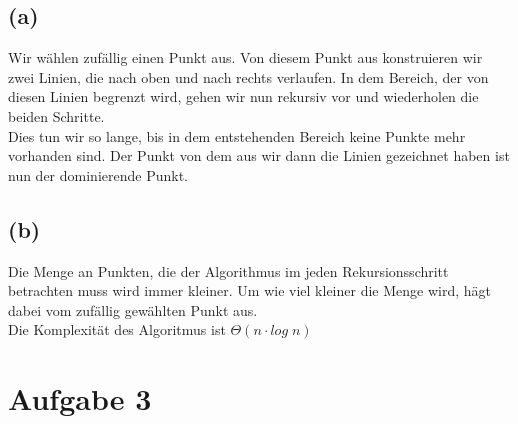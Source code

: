 \documentclass[a4paper]{scrartcl}
\begin{document}
\subsection*{(a)} %
Wir wählen zufällig einen Punkt aus. Von diesem Punkt aus konstruieren wir zwei Linien, die nach oben und nach rechts verlaufen. In dem Bereich, der von diesen Linien begrenzt wird, gehen wir nun rekursiv vor und wiederholen die beiden Schritte.\\
Dies tun wir so lange, bis in dem entstehenden Bereich keine Punkte mehr vorhanden sind. Der Punkt von dem aus wir dann die Linien gezeichnet haben ist nun der dominierende Punkt.


\subsection*{(b)}
Die Menge an Punkten, die der Algorithmus im jeden Rekursionsschritt betrachten muss wird immer kleiner. Um wie viel kleiner die Menge wird, hägt dabei vom zufällig gewählten Punkt aus.\\
Die Komplexität des Algoritmus ist $\Theta (n \cdot log \; n)$









\section*{Aufgabe 3}
\end{document}

